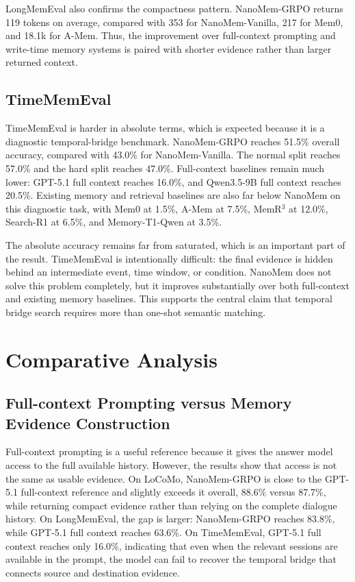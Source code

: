 

LongMemEval also confirms the compactness pattern. NanoMem-GRPO returns 119
tokens on average, compared with 353 for NanoMem-Vanilla, 217 for Mem0, and
18.1k for A-Mem. Thus, the improvement over full-context prompting and
write-time memory systems is paired with shorter evidence rather than larger
returned context.

\subsection{TimeMemEval}
\label{subsec:results-timememeval}

TimeMemEval is harder in absolute terms, which is expected because it is a
diagnostic temporal-bridge benchmark. NanoMem-GRPO reaches 51.5\% overall
accuracy, compared with 43.0\% for NanoMem-Vanilla. The normal split reaches
57.0\% and the hard split reaches 47.0\%. Full-context baselines remain much
lower: GPT-5.1 full context reaches 16.0\%, and Qwen3.5-9B full context reaches
20.5\%. Existing memory and retrieval baselines are also far below NanoMem on
this diagnostic task, with Mem0 at 1.5\%, A-Mem at 7.5\%, MemR$^3$ at 12.0\%,
Search-R1 at 6.5\%, and Memory-T1-Qwen at 3.5\%.



The absolute accuracy remains far from saturated, which is an important part of
the result. TimeMemEval is intentionally difficult: the final evidence is hidden
behind an intermediate event, time window, or condition. NanoMem does not solve
this problem completely, but it improves substantially over both full-context
and existing memory baselines. This supports the central claim that temporal
bridge search requires more than one-shot semantic matching.

\section{Comparative Analysis}
\label{sec:comparative-analysis}

\subsection{Full-context Prompting versus Memory Evidence Construction}
\label{subsec:analysis-full-context}

Full-context prompting is a useful reference because it gives the answer model
access to the full available history. However, the results show that access is
not the same as usable evidence. On LoCoMo, NanoMem-GRPO is close to the
GPT-5.1 full-context reference and slightly exceeds it overall, 88.6\% versus
87.7\%, while returning compact evidence rather than relying on the complete
dialogue history. On LongMemEval, the gap is larger: NanoMem-GRPO reaches
83.8\%, while GPT-5.1 full context reaches 63.6\%. On TimeMemEval, GPT-5.1 full
context reaches only 16.0\%, indicating that even when the relevant sessions are
available in the prompt, the model can fail to recover the temporal bridge that
connects source and destination evidence.

